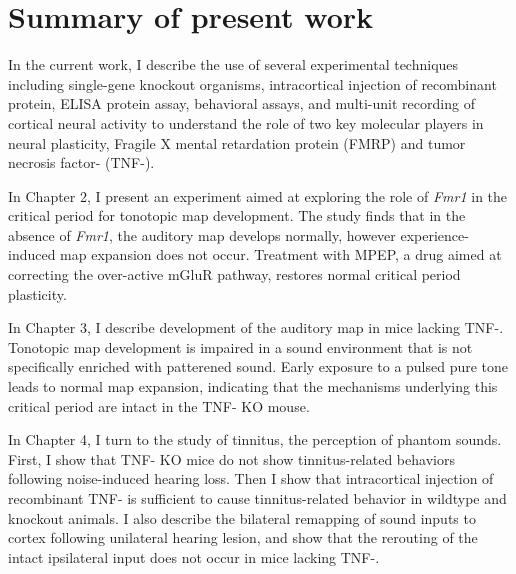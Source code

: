 \section{Summary of present work}

In the current work, I describe the use of several experimental techniques including single-gene knockout organisms, intracortical injection of recombinant protein, ELISA protein assay, behavioral assays, and multi-unit recording of cortical neural activity to understand the role of two key molecular players in neural plasticity, Fragile X mental retardation protein (FMRP) and tumor necrosis factor-\textalpha{} (TNF-\textalpha{}).

In Chapter 2, I present an experiment aimed at exploring the role of \textit{Fmr1} in the critical period for tonotopic map development. The study finds that in the absence of \textit{Fmr1}, the auditory map develops normally, however experience-induced map expansion does not occur. Treatment with MPEP, a drug aimed at correcting the over-active mGluR pathway, restores normal critical period plasticity.

In Chapter 3, I describe development of the auditory map in mice lacking TNF-\textalpha{}. Tonotopic map development is impaired in a sound environment that is not specifically enriched with patterened sound. Early exposure to a pulsed pure tone leads to normal map expansion, indicating that the mechanisms underlying this critical period are intact in the TNF-\textalpha{} KO mouse.

In Chapter 4, I turn to the study of tinnitus, the perception of phantom sounds. First, I show that TNF-\textalpha{} KO mice do not show tinnitus-related behaviors following noise-induced hearing loss. Then I show that intracortical injection of recombinant TNF-\textalpha{} is sufficient to cause tinnitus-related behavior in wildtype and knockout animals. I also describe the bilateral remapping of sound inputs to cortex following unilateral hearing lesion, and show that the rerouting of the intact ipsilateral input does not occur in mice lacking TNF-\textalpha{}.

\printbibliography